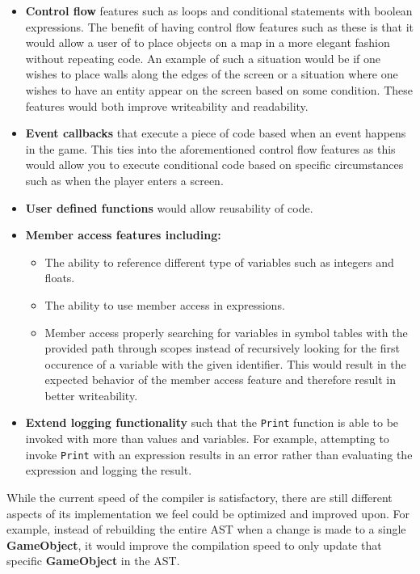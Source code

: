 \begin{itemize}
    \item
      \textbf{Control flow} features such as loops and conditional statements with boolean expressions. The benefit of having control flow features such as these is that it would allow a user of \dazel{} to place objects on a map in a more elegant fashion without repeating code. An example of such a situation would be if one wishes to place walls along the edges of the screen or a situation where one wishes to have an entity appear on the screen based on some condition. These features would both improve writeability and readability.
    \item
      \textbf{Event callbacks} that execute a piece of code based when an event happens in the game. This ties into the aforementioned control flow features as this would allow you to execute conditional code based on specific circumstances such as when the player enters a screen. 
    \item
      \textbf{User defined functions} would allow reusability of code. 
    \item
      \textbf{Member access features including:}
      \begin{itemize}
        \item
            The ability to reference different type of variables such as integers and floats.
        \item
            The ability to use member access in expressions.    
        \item
            Member access properly searching for variables in symbol tables with the provided path through scopes instead of recursively looking for the first occurence of a variable with the given identifier. This would result in the expected behavior of the member access feature and therefore result in better writeability.
      \end{itemize}
    \item
      \textbf{Extend logging functionality} such that the \texttt{Print} function is able to be invoked with more than values and variables. For example, attempting to invoke \texttt{Print} with an expression results in an error rather than evaluating the expression and logging the result.
\end{itemize}

While the current speed of the compiler is satisfactory, there are still different aspects of its implementation we feel could be optimized and improved upon. 
For example, instead of rebuilding the entire AST when a change is made to a single \textbf{GameObject}, it would improve the compilation speed to only update that specific \textbf{GameObject} in the AST.


